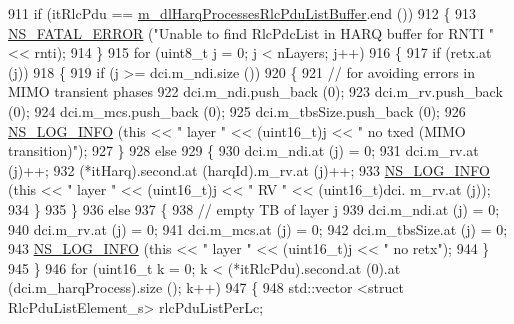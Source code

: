 \begin{DoxyCode}
911           \textcolor{keywordflow}{if} (itRlcPdu == \hyperlink{classns3_1_1TdMtFfMacScheduler_a5c8ba74976d19c98462ea970613b644b}{m\_dlHarqProcessesRlcPduListBuffer}.end ())
912             \{
913               \hyperlink{group__fatal_ga5131d5e3f75d7d4cbfd706ac456fdc85}{NS\_FATAL\_ERROR} (\textcolor{stringliteral}{"Unable to find RlcPdcList in HARQ buffer for RNTI "} << rnti);
914             \}
915           \textcolor{keywordflow}{for} (uint8\_t j = 0; j < nLayers; j++)
916             \{
917               \textcolor{keywordflow}{if} (retx.at (j))
918                 \{
919                   \textcolor{keywordflow}{if} (j >= dci.m\_ndi.size ())
920                     \{
921                       \textcolor{comment}{// for avoiding errors in MIMO transient phases}
922                       dci.m\_ndi.push\_back (0);
923                       dci.m\_rv.push\_back (0);
924                       dci.m\_mcs.push\_back (0);
925                       dci.m\_tbsSize.push\_back (0);
926                       \hyperlink{group__logging_gafbd73ee2cf9f26b319f49086d8e860fb}{NS\_LOG\_INFO} (\textcolor{keyword}{this} << \textcolor{stringliteral}{" layer "} << (uint16\_t)j << \textcolor{stringliteral}{" no txed (MIMO
       transition)"});
927                     \}
928                   \textcolor{keywordflow}{else}
929                     \{
930                       dci.m\_ndi.at (j) = 0;
931                       dci.m\_rv.at (j)++;
932                       (*itHarq).second.at (harqId).m\_rv.at (j)++;
933                       \hyperlink{group__logging_gafbd73ee2cf9f26b319f49086d8e860fb}{NS\_LOG\_INFO} (\textcolor{keyword}{this} << \textcolor{stringliteral}{" layer "} << (uint16\_t)j << \textcolor{stringliteral}{" RV "} << (uint16\_t)dci.
      m\_rv.at (j));
934                     \}
935                 \}
936               \textcolor{keywordflow}{else}
937                 \{
938                   \textcolor{comment}{// empty TB of layer j}
939                   dci.m\_ndi.at (j) = 0;
940                   dci.m\_rv.at (j) = 0;
941                   dci.m\_mcs.at (j) = 0;
942                   dci.m\_tbsSize.at (j) = 0;
943                   \hyperlink{group__logging_gafbd73ee2cf9f26b319f49086d8e860fb}{NS\_LOG\_INFO} (\textcolor{keyword}{this} << \textcolor{stringliteral}{" layer "} << (uint16\_t)j << \textcolor{stringliteral}{" no retx"});
944                 \}
945             \}
946           \textcolor{keywordflow}{for} (uint16\_t k = 0; k < (*itRlcPdu).second.at (0).at (dci.m\_harqProcess).size (); k++)
947             \{
948               std::vector <struct RlcPduListElement\_s> rlcPduListPerLc;

\end{DoxyCode}
